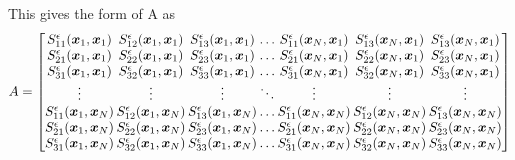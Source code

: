 \normalsize
This gives the form of A as 
\small
\begin{equation}
A = 
\begingroup
\setlength\arraycolsep{1pt}
\begin{bmatrix}
S^{\epsilon}_{11}(\bm{x}_1,{\bm{x}}_1) & S^{\epsilon}_{12}(\bm{x}_1,{\bm{x}}_1) & S^{\epsilon}_{13}(\bm{x}_1,{\bm{x}}_1) & \dots & S^{\epsilon}_{11}(\bm{x}_N,{\bm{x}}_1) & S^{\epsilon}_{13}(\bm{x}_N,{\bm{x}}_1) & S^{\epsilon}_{13}(\bm{x}_N,{\bm{x}}_1)\\
S^{\epsilon}_{21}(\bm{x}_1,{\bm{x}}_1) & S^{\epsilon}_{22}(\bm{x}_1,{\bm{x}}_1) & S^{\epsilon}_{23}(\bm{x}_1,{\bm{x}}_1) & \dots & S^{\epsilon}_{21}(\bm{x}_N,{\bm{x}}_1) & S^{\epsilon}_{22}(\bm{x}_N,{\bm{x}}_1) & S^{\epsilon}_{23}(\bm{x}_N,{\bm{x}}_1)\\
S^{\epsilon}_{31}(\bm{x}_1,{\bm{x}}_1) & S^{\epsilon}_{32}(\bm{x}_1,{\bm{x}}_1) & S^{\epsilon}_{33}(\bm{x}_1,{\bm{x}}_1) & \dots & S^{\epsilon}_{31}(\bm{x}_N,{\bm{x}}_1) & S^{\epsilon}_{32}(\bm{x}_N,{\bm{x}}_1) & S^{\epsilon}_{33}(\bm{x}_N,{\bm{x}}_1)\\
\vdots & \vdots & \vdots & \ddots & \vdots & \vdots & \vdots \\
S^{\epsilon}_{11}(\bm{x}_1,{\bm{x}}_N) & S^{\epsilon}_{12}(\bm{x}_1,{\bm{x}}_N) & S^{\epsilon}_{13}(\bm{x}_1,{\bm{x}}_N) & \dots & S^{\epsilon}_{11}(\bm{x}_N,{\bm{x}}_N) & S^{\epsilon}_{12}(\bm{x}_N,{\bm{x}}_N) & S^{\epsilon}_{13}(\bm{x}_N,{\bm{x}}_N)  \\
S^{\epsilon}_{21}(\bm{x}_1,{\bm{x}}_N) & S^{\epsilon}_{22}(\bm{x}_1,{\bm{x}}_N) & S^{\epsilon}_{23}(\bm{x}_1,{\bm{x}}_N) & \dots & S^{\epsilon}_{21}(\bm{x}_N,{\bm{x}}_N) & S^{\epsilon}_{22}(\bm{x}_N,{\bm{x}}_N) & S^{\epsilon}_{23}(\bm{x}_N,{\bm{x}}_N) \\
S^{\epsilon}_{31}(\bm{x}_1,{\bm{x}}_N) & S^{\epsilon}_{32}(\bm{x}_1,{\bm{x}}_N) & S^{\epsilon}_{33}(\bm{x}_1,{\bm{x}}_N) & \dots & S^{\epsilon}_{31}(\bm{x}_N,{\bm{x}}_N) & S^{\epsilon}_{32}(\bm{x}_N,{\bm{x}}_N) & S^{\epsilon}_{33}(\bm{x}_N,{\bm{x}}_N) \\
\end{bmatrix}
\endgroup
\label{eq:StokeletMatrix}
\end{equation}
\normalsize
